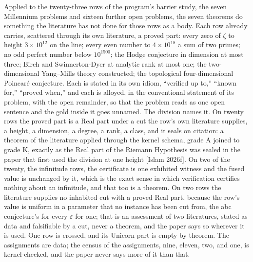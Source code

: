 \documentclass[10pt,twocolumn]{article}
\begin{document}
Applied to the twenty-three rows of the program's barrier study, the
seven Millennium problems and sixteen further open problems, the seven
theorems do something the literature has not done for those rows as a
body. Each row already carries, scattered through its own literature, a
proved part: every zero of \(\zeta\) to height \(3 \times 10^{12}\) on
the line; every even number to \(4 \times 10^{18}\) a sum of two primes;
no odd perfect number below \(10^{1500}\); the Hodge conjecture in
dimension at most three; Birch and Swinnerton-Dyer at analytic rank at
most one; the two-dimensional Yang--Mills theory constructed; the
topological four-dimensional Poincaré conjecture. Each is stated in its
own idiom, ``verified up to,'' ``known for,'' ``proved when,'' and each
is alloyed, in the conventional statement of its problem, with the open
remainder, so that the problem reads as one open sentence and the gold
inside it goes unnamed. The division names it. On twenty rows the proved
part is a Real part under a cut the row's own literature supplies, a
height, a dimension, a degree, a rank, a class, and it seals on
citation: a theorem of the literature applied through the kernel schema,
grade A joined to grade K, exactly as the Real part of the Riemann
Hypothesis was sealed in the paper that first used the division at one
height {[}Islam 2026f{]}. On two of the twenty, the infinitude rows, the
certificate is one exhibited witness and the fused value is unchanged by
it, which is the exact sense in which verification certifies nothing
about an infinitude, and that too is a theorem. On two rows the
literature supplies no inhabited cut with a proved Real part, because
the row's value is uniform in a parameter that no instance has been cut
from, the abc conjecture's for every \(\varepsilon\) for one; that is an
assessment of two literatures, stated as data and falsifiable by a cut,
never a theorem, and the paper says so wherever it is used. One row is
crossed, and its Unicorn part is empty by theorem. The assignments are
data; the census of the assignments, nine, eleven, two, and one, is
kernel-checked, and the paper never says more of it than that.
\end{document}
